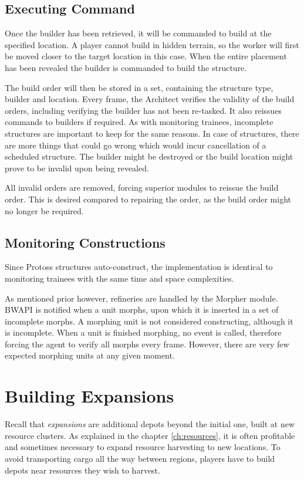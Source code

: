 	\subsection*{Executing Command}
	Once the builder has been retrieved, it will be commanded to build at the specified location. A player cannot build in hidden terrain, so the worker will first be moved closer to the target location in this case. When the entire placement has been revealed the builder is commanded to build the structure.
	
	The build order will then be stored in a set, containing the structure type, builder and location. Every frame, the Architect verifies the validity of the build orders, including verifying the builder has not been re-tasked. It also reissues commands to builders if required. As with monitoring trainees, incomplete structures are important to keep for the same reasons. In case of structures, there are more things that could go wrong which would incur cancellation of a scheduled structure. The builder might be destroyed or the build location might prove to be invalid upon being revealed.
	
	All invalid orders are removed, forcing superior modules to reissue the build order. This is desired compared to repairing the order, as the build order might no longer be required.
	
	\subsection*{Monitoring Constructions}
	Since Protoss structures auto-construct, the implementation is identical to monitoring trainees with the same time and space complexities.
	
	As mentioned prior however, refineries are handled by the Morpher module. BWAPI is notified when a unit morphs, upon which it is inserted in a set of incomplete morphs. A morphing unit is not considered constructing, although it is incomplete. When a unit is finished morphing, no event is called, therefore forcing the agent to verify all morphs every frame. However, there are very few expected morphing units at any given moment.

\section{Building Expansions}
Recall that \emph{expansions} are additional depots beyond the initial one, built at new resource clusters. As explained in the chapter \ref{ch:resources}, it is often profitable and sometimes necessary to expand resource harvesting to new locations. To avoid transporting cargo all the way between regions, players have to build depots near resources they wish to harvest.

